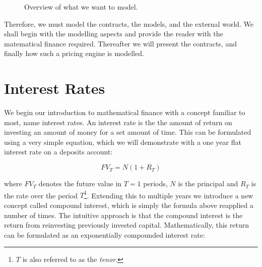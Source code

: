 \begin{figure}[h!]
\begin{center}
\begin{minipage}{\linewidth}
\caption{Overview of what we want to model.}
\label{fig:overview}
\end{minipage}
\end{center}
\end{figure}

Therefore, we must model the contracts, the models, and the external world.
We shall begin with the modelling aspects and provide the reader with the
matematical finance required. Thereafter we will present the contracts, and
finally how such a pricing engine is modelled. 

\section{Interest Rates}

We begin our introduction to mathematical finance with a concept familiar to
most, name interest rates. An interest rate is the the amount of return on
investing an amount of money for a set amount of time. This can be formulated
using a very simple equation, which we will demonstrate with a one year flat
interest rate on a deposits account:

\begin{equation}\label{eq:lincomp}
FV_T = N (1 + R_T)
\end{equation}

where $FV_T$ denotes the future value in $T=1$ periods, $N$ is the principal
and $R_T$ is the rate over the period $T$\footnote{$T$ is also referred to as the
\emph{tenor}.}. Extending this to multiple years we introduce a new 
concept called compound interest, which is simply the formula above reapplied
a number of times. The intuitive approach is
that the compound interest is the return from reinvesting previously invested
capital. Mathematically, this return can be formulated as an exponentially 
compounded interest rate:

